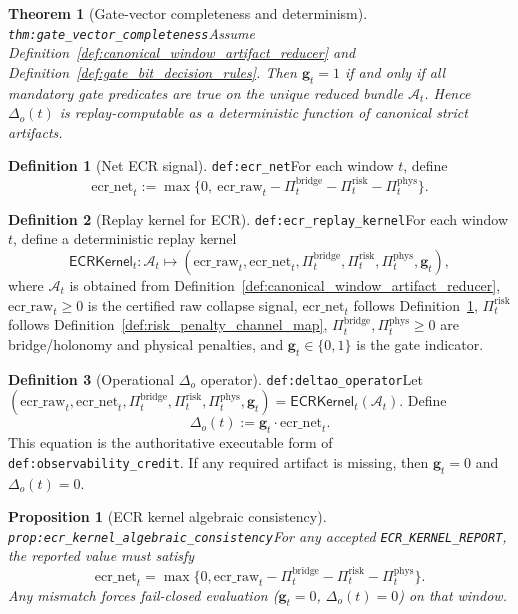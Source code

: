 \documentclass[11pt]{article}
\theoremstyle{definition}
\newtheorem{definition}{Definition}
\theoremstyle{plain}
\newtheorem{proposition}{Proposition}
\newtheorem{theorem}{Theorem}
\newcommand{\lbl}[1]{\texttt{\footnotesize\nolinkurl{#1}}}
\newcommand{\DefLabel}[1]{\hfill{\small\lbl{#1}}}
\newcommand{\deltao}{\Delta_o}
\newcommand{\PiRisk}{\Pi^{\mathrm{risk}}}
\newcommand{\PiBridge}{\Pi^{\mathrm{bridge}}}
\newcommand{\PiPhys}{\Pi^{\mathrm{phys}}}
\begin{document}
\begin{theorem}[Gate-vector completeness and determinism]\DefLabel{thm:gate_vector_completeness}\label{thm:gate_vector_completeness}
Assume Definition~\ref{def:canonical_window_artifact_reducer} and Definition~\ref{def:gate_bit_decision_rules}.
Then $\mathbf{g}_t=1$ if and only if all mandatory gate predicates are true on the unique reduced bundle $\mathcal{A}_t$.
Hence $\deltao(t)$ is replay-computable as a deterministic function of canonical strict artifacts.
\end{theorem}

\begin{definition}[Net ECR signal]\DefLabel{def:ecr_net}\label{def:ecr_net}
For each window $t$, define
\[
\mathrm{ecr\_net}_t:=\max\{0,\ \mathrm{ecr\_raw}_t-\PiBridge_t-\PiRisk_t-\PiPhys_t\}.
\]
\end{definition}

\begin{definition}[Replay kernel for ECR]\DefLabel{def:ecr_replay_kernel}\label{def:ecr_replay_kernel}
For each window $t$, define a deterministic replay kernel
\[
\mathsf{ECRKernel}_t:\mathcal{A}_t\mapsto (\mathrm{ecr\_raw}_t,\mathrm{ecr\_net}_t,\PiBridge_t,\PiRisk_t,\PiPhys_t,\mathbf{g}_t),
\]
where $\mathcal{A}_t$ is obtained from Definition~\ref{def:canonical_window_artifact_reducer},
$\mathrm{ecr\_raw}_t\ge 0$ is the certified raw collapse signal,
$\mathrm{ecr\_net}_t$ follows Definition~\ref{def:ecr_net},
$\PiRisk_t$ follows Definition~\ref{def:risk_penalty_channel_map},
$\PiBridge_t,\PiPhys_t\ge 0$ are bridge/holonomy and physical penalties,
and $\mathbf{g}_t\in\{0,1\}$ is the gate indicator.
\end{definition}

\begin{definition}[Operational $\deltao$ operator]\DefLabel{def:deltao_operator}\label{def:deltao_operator}
Let $(\mathrm{ecr\_raw}_t,\mathrm{ecr\_net}_t,\PiBridge_t,\PiRisk_t,\PiPhys_t,\mathbf{g}_t)=\mathsf{ECRKernel}_t(\mathcal{A}_t)$.
Define
\[
\deltao(t):=\mathbf{g}_t\cdot \mathrm{ecr\_net}_t.
\]
This equation is the authoritative executable form of \lbl{def:observability_credit}. If any required artifact is missing, then $\mathbf{g}_t=0$ and $\deltao(t)=0$.
\end{definition}

\begin{proposition}[ECR kernel algebraic consistency]\DefLabel{prop:ecr_kernel_algebraic_consistency}\label{prop:ecr_kernel_algebraic_consistency}
For any accepted \texttt{ECR\_KERNEL\_REPORT}, the reported value must satisfy
\[
\mathrm{ecr\_net}_t=\max\{0,\mathrm{ecr\_raw}_t-\PiBridge_t-\PiRisk_t-\PiPhys_t\}.
\]
Any mismatch forces fail-closed evaluation ($\mathbf g_t=0$, $\deltao(t)=0$) on that window.
\end{proposition}
\end{document}
